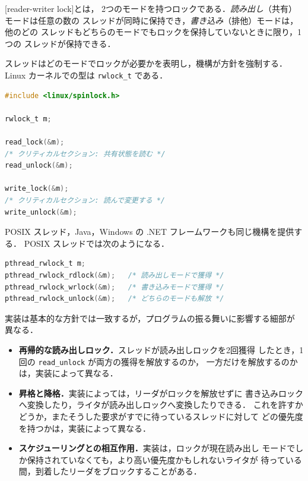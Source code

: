\documentclass[../main.tex]{subfiles}
\begin{document}
\begin{definition}
  [reader-writer lock]とは，
  2つのモードを持つロックである．\emph{読み出し}（共有）モードは任意の数の
  スレッドが同時に保持でき，\emph{書き込み}（排他）モードは，他のどの
  スレッドもどちらのモードでもロックを保持していないときに限り，1つの
  スレッドが保持できる．
\end{definition}

スレッドはどのモードでロックが必要かを表明し，機構が方針を強制する．Linux
カーネルでの型は \texttt{rwlock\_t} である．
\begin{lstlisting}[language=C, numbers=none]
#include <linux/spinlock.h>

rwlock_t m;

read_lock(&m);
/* クリティカルセクション: 共有状態を読む */
read_unlock(&m);

write_lock(&m);
/* クリティカルセクション: 読んで変更する */
write_unlock(&m);
\end{lstlisting}
POSIX スレッド，Java，Windows の .NET フレームワークも同じ機構を提供する．
POSIX スレッドでは次のようになる．
\begin{lstlisting}[language=C, numbers=none]
pthread_rwlock_t m;
pthread_rwlock_rdlock(&m);   /* 読み出しモードで獲得 */
pthread_rwlock_wrlock(&m);   /* 書き込みモードで獲得 */
pthread_rwlock_unlock(&m);   /* どちらのモードも解放 */
\end{lstlisting}

実装は基本的な方針では一致するが，プログラムの振る舞いに影響する細部が
異なる．
\begin{itemize}
  \item \textbf{再帰的な読み出しロック．}スレッドが読み出しロックを2回獲得
    したとき，1回の \texttt{read\_unlock} が両方の獲得を解放するのか，
    一方だけを解放するのかは，実装によって異なる．
  \item \textbf{昇格と降格．}実装によっては，リーダがロックを解放せずに
    書き込みロックへ変換したり，ライタが読み出しロックへ変換したりできる．
    これを許すかどうか，またそうした要求がすでに待っているスレッドに対して
    どの優先度を持つかは，実装によって異なる．
  \item \textbf{スケジューリングとの相互作用．}実装は，ロックが現在読み出し
    モードでしか保持されていなくても，より高い優先度かもしれないライタが
    待っている間，到着したリーダをブロックすることがある．
\end{itemize}
\end{document}
